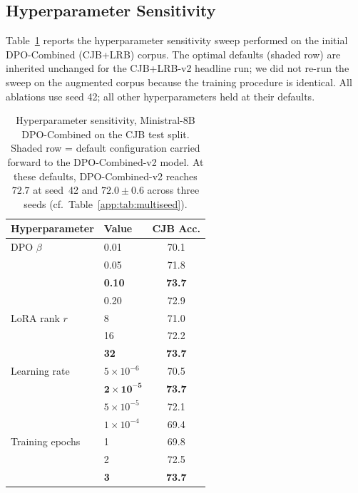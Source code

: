 \documentclass{article}
\theoremstyle{plain}
\theoremstyle{definition}
\theoremstyle{remark}
\begin{document}

\subsection{Hyperparameter Sensitivity}
\label{app:hyperparam}

Table~\ref{app:tab:hparam} reports the hyperparameter sensitivity sweep performed on the initial DPO-Combined (CJB+LRB) corpus.  The optimal defaults (shaded row) are inherited unchanged for the CJB+LRB-v2 headline run; we did not re-run the sweep on the augmented corpus because the training procedure is identical.  All ablations use seed 42; all other hyperparameters held at their defaults.

\begin{table}[h]
\centering
\caption{Hyperparameter sensitivity, Ministral-8B DPO-Combined on the CJB test split. Shaded row = default configuration carried forward to the DPO-Combined-v2 model. At these defaults, DPO-Combined-v2 reaches $72.7$ at seed~42 and $72.0 \pm 0.6$ across three seeds (cf.~Table~\ref{app:tab:multiseed}).}
\label{app:tab:hparam}
\small
\setlength{\tabcolsep}{4pt}
\begin{tabular}{llc}
\toprule
\textbf{Hyperparameter} & \textbf{Value} & \textbf{CJB Acc.} \\
\midrule
DPO $\beta$          & 0.01 & 70.1 \\
                     & 0.05 & 71.8 \\
\rowcolor{gray!10}   & \textbf{0.10} & \textbf{73.7} \\
                     & 0.20 & 72.9 \\
\midrule
LoRA rank $r$        & 8  & 71.0 \\
                     & 16 & 72.2 \\
\rowcolor{gray!10}   & \textbf{32} & \textbf{73.7} \\
\midrule
Learning rate        & $5{\times}10^{-6}$ & 70.5 \\
\rowcolor{gray!10}   & $\mathbf{2{\times}10^{-5}}$ & \textbf{73.7} \\
                     & $5{\times}10^{-5}$ & 72.1 \\
                     & $1{\times}10^{-4}$ & 69.4 \\
\midrule
Training epochs      & 1 & 69.8 \\
                     & 2 & 72.5 \\
\rowcolor{gray!10}   & \textbf{3} & \textbf{73.7} \\
\bottomrule
\end{tabular}
\end{table}
\end{document}
